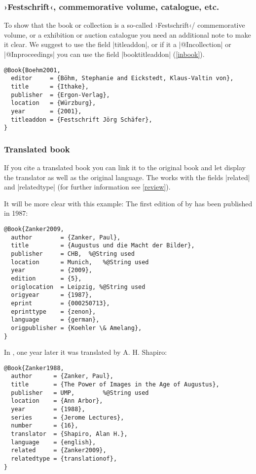 \documentclass[a4paper,
10pt,
greek,
french,
spanish,
italian,
ngerman,
english
]{ltxdoc}
\begin{document}
\subsubsection{›Festschrift‹, commemorative volume, catalogue, etc.}
To show that the book or collection is a so-called ›Festschrift‹/ commemorative volume, or a exhibition or auction catalogue you need an additional note to make it clear.
We suggest to use the field |titleaddon|, or if it a |@Incollection| or |@Inproceedings| you can use the field |booktitleaddon| (\cref{inbook}).
\begin{lstlisting}[style=bibentry,label=Boehm2001,caption={{@}Book\{Boehm2001,…\} }]
@Book{Boehm2001,
  editor     = {Böhm, Stephanie and Eickstedt, Klaus-Valtin von},
  title      = {Ithake},
  publisher  = {Ergon-Verlag},
  location   = {Würzburg},
  year       = {2001},
  titleaddon = {Festschrift Jörg Schäfer},
}
\end{lstlisting}

 
 \subsubsection{Translated book}
If you cite a translated book you can link it to the original book and let display the translator as well as the original language. 
The works with the fields |related| and |relatedtype| (for further information see \cref{review}).

It will be more clear with this example:
The first edition of   by \citeauthor*{Zanker2009}  has been published in 1987:
\begin{lstlisting}[style=bibentry,label=Zanker2009,caption={{@}Book\{Zanker2009,…\} }]
@Book{Zanker2009,
  author        = {Zanker, Paul},
  title         = {Augustus und die Macht der Bilder},
  publisher     = CHB, 	%@String used
  location      = Munich,	%@String used
  year          = {2009},
  edition       = {5},
  origlocation  = Leipzig, %@String used
  origyear      = {1987},
  eprint        = {000250713},
  eprinttype    = {zenon},
  language      = {german},
  origpublisher = {Koehler \& Amelang},
}
\end{lstlisting}
In \citeyear{Zanker1988}, one year later  it was translated by A. H. Shapiro:
\begin{lstlisting}[style=bibentry,label=Zanker1988,caption={{@}Book\{Zanker1988,…\} }]
@Book{Zanker1988,
  author      = {Zanker, Paul},
  title       = {The Power of Images in the Age of Augustus},
  publisher   = UMP,		%@String used
  location    = {Ann Arbor},
  year        = {1988},
  series      = {Jerome Lectures},
  number      = {16},
  translator  = {Shapiro, Alan H.},
  language    = {english},
  related     = {Zanker2009},
  relatedtype = {translationof},
}
\end{lstlisting}
\end{document}
